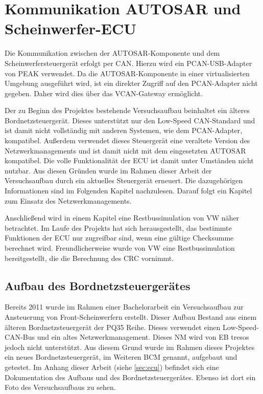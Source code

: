 \documentclass[
  a4paper,					    %
  twoside,
  DIV=calc,     				%
  bibliography=totoc,
  cleardoublepage=empty,
  ngerman,     					%
  final       					%
]{scrbook}
\begin{document}
\section{Kommunikation AUTOSAR und Scheinwerfer-ECU}
\label{sec:Kommunikation_A_S}
Die Kommunikation zwischen der AUTOSAR-Komponente und dem Scheinwerfersteuergerät erfolgt per CAN. Hierzu wird ein PCAN-USB-Adapter von PEAK verwendet. Da die AUTOSAR-Komponente in einer virtualisierten Umgebung ausgeführt wird, ist ein direkter Zugriff auf den PCAN-Adapter nicht gegeben. Daher wird dies über das VCAN-Gateway ermöglicht.

Der zu Beginn des Projektes bestehende Versuchsaufbau beinhaltet ein älteres Bordnetzsteuergerät. Dieses unterstützt nur den Low-Speed CAN-Standard und ist damit nicht vollständig mit anderen Systemen, wie dem PCAN-Adapter, kompatibel. Außerdem verwendet dieses Steuergerät eine veraltete Version des Netzwerkmanagements und ist damit nicht mit dem eingesetzten AUTOSAR kompatibel. Die volle Funktionalität der ECU ist damit unter Umständen nicht nutzbar. Aus diesen Gründen wurde im Rahmen dieser Arbeit der Versuchsaufbau durch ein aktuelles Steuergerät erneuert. Die dazugehörigen Informationen sind im Folgenden Kapitel nachzulesen. Darauf folgt ein Kapitel zum Einsatz des Netzwerkmanagements.

Anschließend wird in einem Kapitel eine Restbussimulation von VW näher betrachtet. Im Laufe des Projekts hat sich herausgestellt, das bestimmte Funktionen der ECU nur zugreifbar sind, wenn eine gültige Checksumme berechnet wird. Freundlicherweise wurde von VW eine Restbussimulation bereitgestellt, die die Berechnung des CRC vornimmt.




\subsection{Aufbau des Bordnetzsteuergerätes}
\label{sec:Aufbau_der_ECU}
Bereits 2011 wurde im Rahmen einer Bachelorarbeit ein Versuchsaufbau zur Ansteuerung von Front-Scheinwerfern erstellt. Dieser Aufbau Bestand aus einem älteren Bordnetzsteuergerät der PQ35 Reihe. Dieses verwendet einen Low-Speed-CAN-Bus und ein altes Netzwerkmanagement. Dieses NM wird von EB tresos jedoch nicht unterstützt. Aus diesem Grund wurde im Rahmen dieses Projektes ein neues Bordnetzsteuergerät, im Weiteren BCM genannt, aufgebaut und getestet. Im Anhang dieser Arbeit (siehe \ref{sec:ecu}) befindet sich eine Dokumentation des Aufbaus und des Bordnetzsteuergerätes. Ebenso ist dort ein Foto des Versuchsaufbaus zu sehen.
\end{document}
